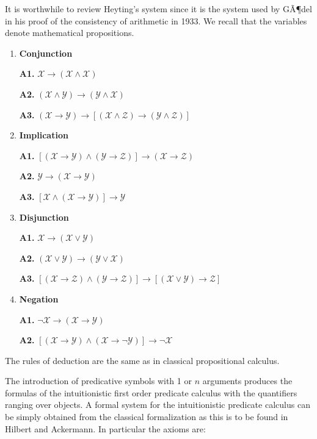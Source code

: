 \documentclass[12pt]{article}
\begin{document}
It is worthwhile to review Heyting's system since it is the system used by GÃ¶del in his proof of the consistency of arithmetic in 1933. We recall that the variables denote mathematical propositions.

\begin{enumerate}
\item \textbf{Conjunction}

\textbf{A1.} $\mathcal{X} \rightarrow (\mathcal{X} \wedge \mathcal{X})$

\textbf{A2.} $(\mathcal{X} \wedge \mathcal{Y}) \rightarrow (\mathcal{Y} \wedge \mathcal{X})$

\textbf{A3.} $(\mathcal{X} \rightarrow \mathcal{Y}) \rightarrow [(\mathcal{X} \wedge \mathcal{Z}) \rightarrow (\mathcal{Y} \wedge \mathcal{Z})]$

\item \textbf{Implication}

\textbf{A1.} $[(\mathcal{X} \rightarrow \mathcal{Y}) \wedge (\mathcal{Y} \rightarrow \mathcal{Z})] \rightarrow (\mathcal{X} \rightarrow \mathcal{Z})$

\textbf{A2.} $\mathcal{Y} \rightarrow (\mathcal{X} \rightarrow \mathcal{Y})$

\textbf{A3.} $[\mathcal{X} \wedge (\mathcal{X} \rightarrow \mathcal{Y})] \rightarrow \mathcal{Y}$

\item \textbf{Disjunction}

\textbf{A1.} $\mathcal{X} \rightarrow (\mathcal{X} \vee \mathcal{Y})$

\textbf{A2.} $(\mathcal{X} \vee \mathcal{Y}) \rightarrow (\mathcal{Y} \vee \mathcal{X})$

\textbf{A3.} $[(\mathcal{X} \rightarrow \mathcal{Z}) \wedge (\mathcal{Y} \rightarrow \mathcal{Z})] \rightarrow [(\mathcal{X} \vee \mathcal{Y}) \rightarrow \mathcal{Z}]$

\item \textbf{Negation}

\textbf{A1.} $\neg \mathcal{X} \rightarrow (\mathcal{X} \rightarrow \mathcal{Y})$

\textbf{A2.} $[(\mathcal{X} \rightarrow \mathcal{Y}) \wedge (\mathcal{X} \rightarrow \neg \mathcal{Y})] \rightarrow \neg \mathcal{X}$

\end{enumerate}

The rules of deduction are the same as in classical propositional calculus.

The introduction of predicative symbols with 1 or $n$ arguments produces the formulas of the intuitionistic first order predicate calculus with the quantifiers ranging over objects. A formal system for the intuitionistic predicate calculus can be simply obtained from the classical formalization as this is to be found in Hilbert and Ackermann. In particular the axioms are:
\end{document}
